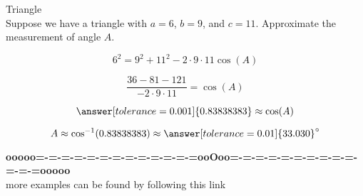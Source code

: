 \documentclass{ximera}
\begin{document}
\begin{example} Triangle \\

Suppose we have a triangle with $a=6$, $b=9$, and $c=11$. Approximate the measurement of angle $A$.

\[    6^2 = 9^2  +  11^2  - 2 \cdot 9 \cdot 11 \cos(A)   \]


\[    \frac{36 - 81 - 121}{- 2 \cdot 9 \cdot 11} =    \cos(A)   \]

\[  \answer[tolerance=0.001]{0.83838383} \approx \cos(A)  \]


\[ A \approx \cos^{-1}(0.83838383)  \approx \answer[tolerance=0.01]{33.030}^{\circ}   \]


\end{example}











\begin{center}
\textbf{\textcolor{green!50!black}{ooooo=-=-=-=-=-=-=-=-=-=-=-=-=ooOoo=-=-=-=-=-=-=-=-=-=-=-=-=ooooo}} \\

more examples can be found by following this link\\ 

\end{center}
\end{document}
